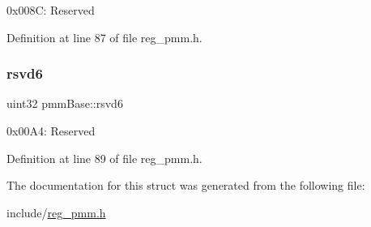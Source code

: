 0x008C\+: Reserved 

Definition at line 87 of file reg\+\_\+pmm.\+h.

\mbox{\label{structpmmBase_a335f472f79d6353f2375f97171e9c029}} 
\subsubsection{\texorpdfstring{rsvd6}{rsvd6}}
{\footnotesize\ttfamily uint32 pmm\+Base\+::rsvd6}

0x00\+A4\+: Reserved 

Definition at line 89 of file reg\+\_\+pmm.\+h.



The documentation for this struct was generated from the following file\+:\begin{DoxyCompactItemize}
\item 
include/\mbox{\hyperlink{reg__pmm_8h}{reg\+\_\+pmm.\+h}}\end{DoxyCompactItemize}
